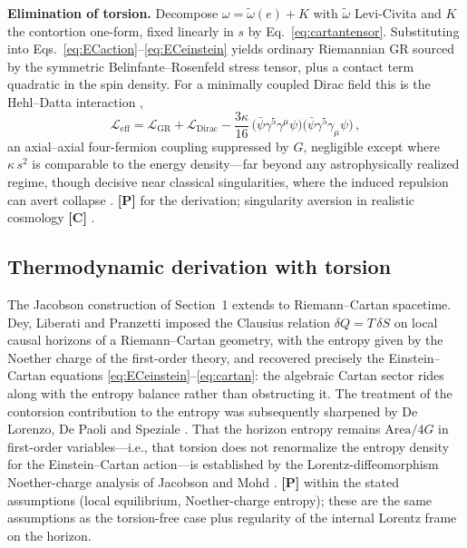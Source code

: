 \documentclass[11pt]{article}
\theoremstyle{definition}
\newcommand{\pP}{\textbf{[P]}}
\newcommand{\pC}{\textbf{[C]}}
\begin{document}
\smallskip
\noindent\textbf{Elimination of torsion.} Decompose
$\omega=\tilde\omega(e)+K$ with $\tilde\omega$ Levi-Civita and $K$ the
contortion one-form, fixed linearly in $s$ by
Eq.~\eqref{eq:cartantensor}. Substituting into
Eqs.~\eqref{eq:ECaction}--\eqref{eq:ECeinstein} yields ordinary Riemannian
GR sourced by the symmetric Belinfante--Rosenfeld stress tensor, plus a
contact term quadratic in the spin density. For a minimally coupled Dirac
field this is the Hehl--Datta interaction \cite{HehlDatta1971},
\begin{equation}
\mathcal{L}_{\mathrm{eff}}
=\mathcal{L}_{\mathrm{GR}}+\mathcal{L}_{\mathrm{Dirac}}
-\frac{3\kappa}{16}\,
\big(\bar\psi\gamma^5\gamma^\mu\psi\big)
\big(\bar\psi\gamma^5\gamma_\mu\psi\big)\,,
\label{eq:hehldatta}
\end{equation}
an axial--axial four-fermion coupling suppressed by $G$, negligible except
where $\kappa\,s^2$ is comparable to the energy density---far beyond any
astrophysically realized regime, though decisive near classical
singularities, where the induced repulsion can avert collapse
\cite{Trautman1973}. \pP{} for the derivation;
singularity aversion in realistic cosmology \pC{} \cite{Poplawski2010}.

\subsection{Thermodynamic derivation with torsion}

The Jacobson construction of Section~1 extends to Riemann--Cartan
spacetime. Dey, Liberati and Pranzetti \cite{DLP2017} imposed the Clausius
relation $\delta Q=T\,\delta S$ on local causal horizons of a
Riemann--Cartan geometry, with the entropy given by the Noether charge of
the first-order theory, and recovered precisely the Einstein--Cartan
equations \eqref{eq:ECeinstein}--\eqref{eq:cartan}: the algebraic Cartan
sector rides along with the entropy balance rather than obstructing it. The
treatment of the contorsion contribution to the entropy was subsequently
sharpened by De Lorenzo, De Paoli and Speziale \cite{DDS2018}. That the
horizon entropy remains $\mathrm{Area}/4G$ in first-order variables---i.e.,
that torsion does not renormalize the entropy density for the
Einstein--Cartan action---is established by the Lorentz-diffeomorphism
Noether-charge analysis of Jacobson and Mohd \cite{JacobsonMohd2015}. \pP{}
within the stated assumptions (local equilibrium, Noether-charge entropy);
these are the same assumptions as the torsion-free case plus regularity of
the internal Lorentz frame on the horizon.
\end{document}
